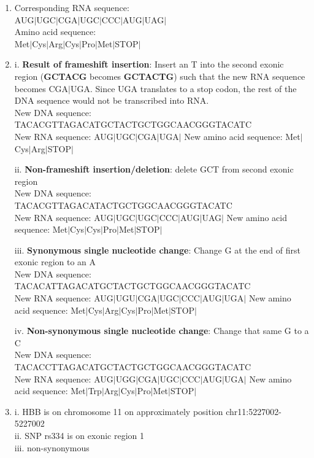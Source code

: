 \documentclass[12pt]{article}
\begin{document}
\begin{enumerate}
\item Corresponding RNA sequence: \\
AUG$|$UGC$|$CGA$|$UGC$|$CCC$|$AUG$|$UAG$|$ \\
Amino acid sequence: \\
Met$|$Cys$|$Arg$|$Cys$|$Pro$|$Met$|$STOP$|$

\item i. \textbf{Result of frameshift insertion}: Insert an T into the second exonic region (\textbf{GCTACG} becomes \textbf{GCTACTG}) such that the new RNA sequence becomes CGA$|$UGA. Since UGA translates to a stop codon, the rest of the DNA sequence would not be transcribed into RNA.\\ 
New DNA sequence: TACACGTTAGACATGCTACTGCTGGCAACGGGTACATC \\
New RNA sequence: AUG$|$UGC$|$CGA$|$UGA$|$
New amino acid sequence: Met$|$Cys$|$Arg$|$STOP$|$

ii. \textbf{Non-frameshift insertion/deletion}: delete GCT from second exonic region \\
New DNA sequence: TACACGTTAGACATACTGCTGGCAACGGGTACATC \\
New RNA sequence: AUG$|$UGC$|$UGC$|$CCC$|$AUG$|$UAG$|$
New amino acid sequence: Met$|$Cys$|$Cys$|$Pro$|$Met$|$STOP$|$

iii. \textbf{Synonymous single nucleotide change}: Change G at the end of first exonic region to an A \\
New DNA sequence: TACACATTAGACATGCTACTGCTGGCAACGGGTACATC \\
New RNA sequence: AUG$|$UGU$|$CGA$|$UGC$|$CCC$|$AUG$|$UGA$|$
New amino acid sequence: Met$|$Cys$|$Arg$|$Cys$|$Pro$|$Met$|$STOP$|$

iv. \textbf{Non-synonymous single nucleotide change}: Change that same G to a C \\
New DNA sequence: TACACCTTAGACATGCTACTGCTGGCAACGGGTACATC \\
New RNA sequence: AUG$|$UGG$|$CGA$|$UGC$|$CCC$|$AUG$|$UGA$|$
New amino acid sequence: Met$|$Trp$|$Arg$|$Cys$|$Pro$|$Met$|$STOP$|$

\item i. HBB is on chromosome 11 on approximately position chr11:5227002-5227002 \\
ii. SNP rs334 is on exonic region 1 \\
iii. non-synonymous 


\end{enumerate}
\end{document}
